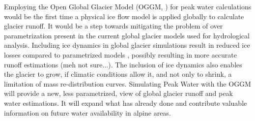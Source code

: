 \documentclass[12pt, a4paper]{article}
\begin{document}
Employing the Open Global Glacier Model (OGGM,
\cite{maussionOpenGlobalGlacier2019}) for peak water calculations would be the
first time a physical ice flow model is applied globally to calculate glacier
runoff. It would be a step towards mitigating the problem of over
parametrization present in the current global glacier models used for
hydrological analysis. Including ice dynamics in global glacier simulations
result in reduced ice losses compared to parametrized models
\parencite{zekollariModellingFutureEvolution2019}, possibly resulting in more
accurate runoff estimations (meh not sure...). The inclusion of ice dynamics
also enables the glacier to grow, if climatic conditions allow it, and not only
to shrink, a limitation of mass re-distribution curves. Simulating Peak Water
with the OGGM will provide a new, less parametrized, view of global glacier
runoff and peak water estimations. It will expand what has already done and
contribute valuable information on future water availability in alpine areas. 

\end{document}
